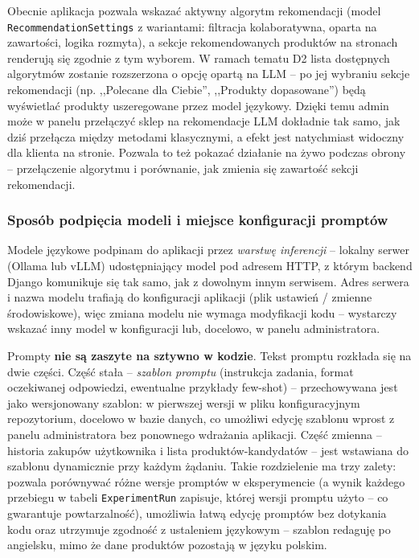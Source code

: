 \documentclass[12pt,a4paper]{article}
\newcommand{\topicsection}[1]{\subsubsection*{#1}}
\begin{document}
Obecnie aplikacja pozwala wskazać aktywny algorytm rekomendacji (model \texttt{RecommendationSettings} z wariantami: filtracja kolaboratywna, oparta na zawartości, logika rozmyta), a sekcje rekomendowanych produktów na stronach renderują się zgodnie z tym wyborem. W ramach tematu D2 lista dostępnych algorytmów zostanie rozszerzona o opcję opartą na LLM -- po jej wybraniu sekcje rekomendacji (np. ,,Polecane dla Ciebie'', ,,Produkty dopasowane'') będą wyświetlać produkty uszeregowane przez model językowy. Dzięki temu admin może w panelu przełączyć sklep na rekomendacje LLM dokładnie tak samo, jak dziś przełącza między metodami klasycznymi, a efekt jest natychmiast widoczny dla klienta na stronie. Pozwala to też pokazać działanie na żywo podczas obrony -- przełączenie algorytmu i porównanie, jak zmienia się zawartość sekcji rekomendacji.

\topicsection{Sposób podpięcia modeli i miejsce konfiguracji promptów}
Modele językowe podpinam do aplikacji przez \emph{warstwę inferencji} -- lokalny serwer (Ollama lub vLLM) udostępniający model pod adresem HTTP, z którym backend Django komunikuje się tak samo, jak z dowolnym innym serwisem. Adres serwera i nazwa modelu trafiają do konfiguracji aplikacji (plik ustawień / zmienne środowiskowe), więc zmiana modelu nie wymaga modyfikacji kodu -- wystarczy wskazać inny model w konfiguracji lub, docelowo, w panelu administratora.

Prompty \textbf{nie są zaszyte na sztywno w kodzie}. Tekst promptu rozkłada się na dwie części. Część stała -- \emph{szablon promptu} (instrukcja zadania, format oczekiwanej odpowiedzi, ewentualne przykłady few-shot) -- przechowywana jest jako wersjonowany szablon: w pierwszej wersji w pliku konfiguracyjnym repozytorium, docelowo w bazie danych, co umożliwi edycję szablonu wprost z panelu administratora bez ponownego wdrażania aplikacji. Część zmienna -- historia zakupów użytkownika i lista produktów-kandydatów -- jest wstawiana do szablonu dynamicznie przy każdym żądaniu. Takie rozdzielenie ma trzy zalety: pozwala porównywać różne wersje promptów w eksperymencie (a wynik każdego przebiegu w tabeli \texttt{ExperimentRun} zapisuje, której wersji promptu użyto -- co gwarantuje powtarzalność), umożliwia łatwą edycję promptów bez dotykania kodu oraz utrzymuje zgodność z ustaleniem językowym -- szablon redaguję po angielsku, mimo że dane produktów pozostają w języku polskim.
\end{document}
